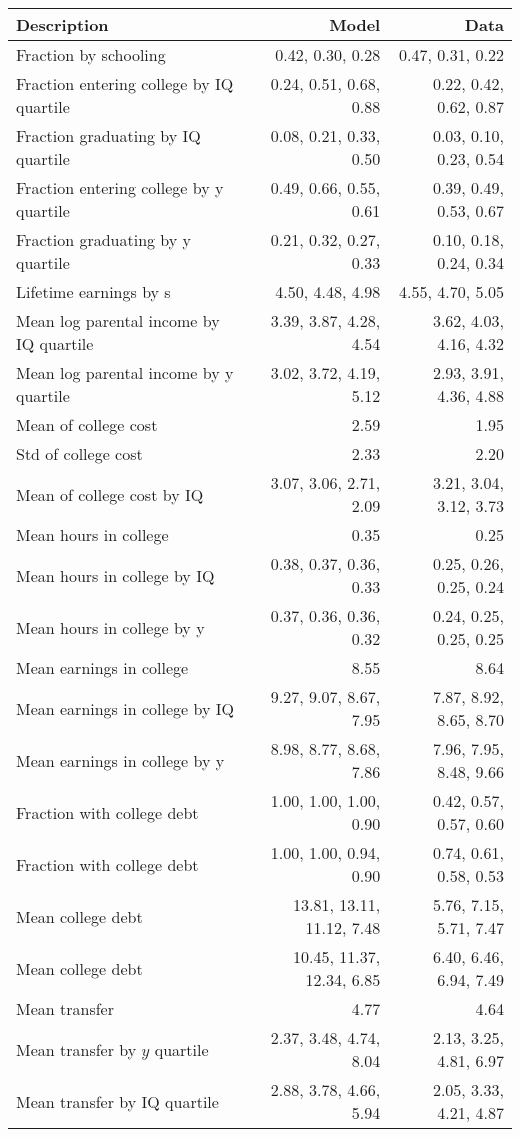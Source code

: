 \begin{tabular}{lrr}
\hline
Description & Model  & Data  \\
\hline
Fraction by schooling & 0.42, 0.30, 0.28  & 0.47, 0.31, 0.22  \\
Fraction entering college by IQ quartile & 0.24, 0.51, 0.68, 0.88  & 0.22, 0.42, 0.62, 0.87  \\
Fraction graduating by IQ quartile & 0.08, 0.21, 0.33, 0.50  & 0.03, 0.10, 0.23, 0.54  \\
Fraction entering college by y quartile & 0.49, 0.66, 0.55, 0.61  & 0.39, 0.49, 0.53, 0.67  \\
Fraction graduating by y quartile & 0.21, 0.32, 0.27, 0.33  & 0.10, 0.18, 0.24, 0.34  \\
Lifetime earnings by s & 4.50, 4.48, 4.98  & 4.55, 4.70, 5.05  \\
Mean log parental income by IQ quartile & 3.39, 3.87, 4.28, 4.54  & 3.62, 4.03, 4.16, 4.32  \\
Mean log parental income by y quartile & 3.02, 3.72, 4.19, 5.12  & 2.93, 3.91, 4.36, 4.88  \\
Mean of college cost & 2.59  & 1.95  \\
Std of college cost & 2.33  & 2.20  \\
Mean of college cost by IQ & 3.07, 3.06, 2.71, 2.09  & 3.21, 3.04, 3.12, 3.73  \\
Mean hours in college & 0.35  & 0.25  \\
Mean hours in college by IQ & 0.38, 0.37, 0.36, 0.33  & 0.25, 0.26, 0.25, 0.24  \\
Mean hours in college by y & 0.37, 0.36, 0.36, 0.32  & 0.24, 0.25, 0.25, 0.25  \\
Mean earnings in college & 8.55  & 8.64  \\
Mean earnings in college by IQ & 9.27, 9.07, 8.67, 7.95  & 7.87, 8.92, 8.65, 8.70  \\
Mean earnings in college by y & 8.98, 8.77, 8.68, 7.86  & 7.96, 7.95, 8.48, 9.66  \\
Fraction with college debt & 1.00, 1.00, 1.00, 0.90  & 0.42, 0.57, 0.57, 0.60  \\
Fraction with college debt & 1.00, 1.00, 0.94, 0.90  & 0.74, 0.61, 0.58, 0.53  \\
Mean college debt & 13.81, 13.11, 11.12, 7.48  & 5.76, 7.15, 5.71, 7.47  \\
Mean college debt & 10.45, 11.37, 12.34, 6.85  & 6.40, 6.46, 6.94, 7.49  \\
Mean transfer & 4.77  & 4.64  \\
Mean transfer by $y$ quartile & 2.37, 3.48, 4.74, 8.04  & 2.13, 3.25, 4.81, 6.97  \\
Mean transfer by IQ quartile & 2.88, 3.78, 4.66, 5.94  & 2.05, 3.33, 4.21, 4.87  \\
\hline
\end{tabular}%
